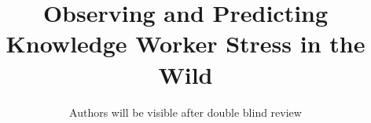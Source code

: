 \documentclass{sigchi}
\begin{document}
	
	\title{Observing and Predicting Knowledge Worker Stress in the Wild}
	
	
	\author{Authors will be visible after double blind review\vspace{0cm}
	\vspace{18ex}}
	
	
	\begin{comment}
	
	\author{Mauricio Soto}
	\affiliation{%
	\institution{Carnegie Mellon University}
	\city{Pittsburgh}
	\state{PA}
	}
	\email{mauriciosoto@cmu.edu}
	
	\author{Chris Satterfield}
	\affiliation{%
	\institution{The University of British Columbia}
	\city{Vancouver}
	\state{British Columbia}
	}
	\email{cds00@cs.ubc.ca}
	
	\author{Thomas Fritz}
	\affiliation{%
	\institution{University of Zurich}
	\city{Zurich}
	\state{Switzerland}
	}
	\email{fritz@ifi.uzh.ch}
	
	\author{Gail C. Murphy}
	\affiliation{%
	\institution{The University of British olumbia}
	\city{Vancouver}
	\state{British Columbia}
	}
	\email{murphy@cs.ubc.ca}
	
	\author{David Shepherd}
	\affiliation{%
	\institution{ABB Corporate Research}
	\city{Raleigh}
	\state{North Carolina}
	}
	\email{david.shepherd@us.abb.com}
	
	\author{Nicholas Kraft}
	\affiliation{%
	\institution{ABB Corporate Research}
	\city{Raleigh}
	\state{North Carolina}
	}
	\email{nicholas.a.kraft@us.abb.com}
	
	\end{comment}
	
	\maketitle
	
	
\end{document}
